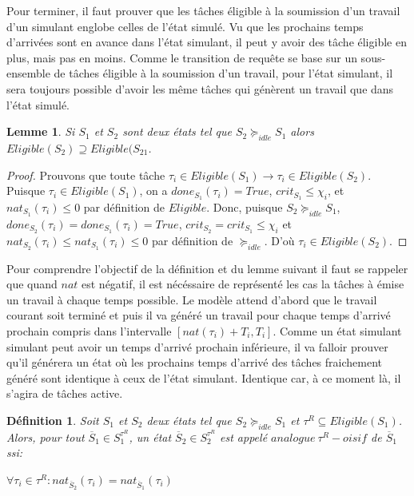\documentclass[12pt,a4paper,oneside]{book}
\theoremstyle{break}
\newtheorem{defin}{Définition}[chapter]
\theoremstyle{breakplain}
\newtheorem{lem}{Lemme}[chapter]
\begin{document}
Pour terminer, il faut prouver que les tâches éligible à la soumission d'un travail d'un simulant englobe celles de l'état simulé. Vu que les prochains temps d'arrivées sont en avance dans l'état simulant, il peut y avoir des tâche éligible en plus, mais pas en moins. Comme le transition de requête se base sur un sous-ensemble de tâches éligible à la soumission d'un travail, pour l'état simulant, il sera toujours possible d'avoir les même tâches qui génèrent un travail que dans l'état simulé.

\begin{lem}
\label{idle:elisuper}
Si $S_1$ et $S_2$ sont deux états tel que $S_2 \succeq_{idle}S_1$ alors $Eligible(S_2) \supseteq Eligible(S_21$.
\end{lem}
\begin{proof} Prouvons que toute tâche $\tau_i \in Eligible(S_1) \rightarrow \tau_i \in Eligible(S_2)$. Puisque $\tau_i \in Eligible(S_1)$, on a $done_{S_1}(\tau_i) = True$,  $crit_{S_1} \leq \chi_i$, et $nat_{S_1}(\tau_i) \leq 0$ par définition de $Eligible$. Donc, puisque $S_2 \succeq_{idle}S_1$, $done_{S_2}(\tau_i) = done_{S_1}(\tau_i) = True$,  $crit_{S_2} = crit_{S_1} \leq \chi_i$ et $nat_{S_2}(\tau_i) \leq nat_{S_1}(\tau_i) \leq 0$ par définition de $\succeq_{idle}$. D'où $\tau_i \in Eligible(S_2)$.
\end{proof}

Pour comprendre l'objectif de la définition et du lemme suivant il faut se rappeler que quand $nat$ est négatif, il est nécéssaire de représenté les cas la tâches à émise un travail à chaque temps possible. Le modèle attend d'abord que le travail courant soit terminé et puis il va généré un travail pour chaque temps d'arrivé prochain compris dans l'intervalle $[nat(\tau_i)+T_i, T_i]$. Comme un état simulant simulant peut avoir un temps d'arrivé prochain inférieure, il va falloir prouver qu'il générera un état où les prochains temps d'arrivé des tâches fraichement généré sont identique à ceux de l'état simulant. Identique car, à ce moment là, il s'agira de tâches active.

\begin{defin}
\label{idle:reqanalogue}
Soit $S_1$ et $S_2$ deux états tel que $S_2 \succeq_{idle} S_1$ et $\tau^R \subseteq Eligible(S_1)$. Alors, pour tout $\overline{S}_1\in S_1^{\tau^R}$, un état  $\overline{S}_2\in S_2^{\tau^R}$ est appelé $analogue\ \tau^R-oisif$ de $\overline{S}_1$ ssi:
\begin{center}
$\forall \tau_i \in \tau^R : nat_{\overline{S}_2}(\tau_i) = nat_{\overline{S}_1}(\tau_i) $
\end{center}
\end{defin}
\end{document}
